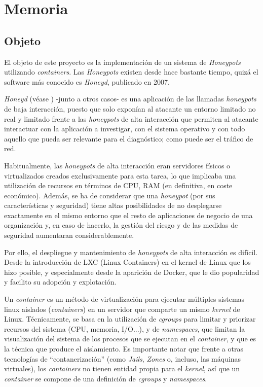 \chapter{Memoria}
\minitoc{}
\section{Objeto}
El objeto de este proyecto es la implementación de un sistema de \emph{Honeypots} utilizando \emph{containers}. 
Las \emph{Honeypots} existen desde hace bastante tiempo, quizá el software más conocido es \emph{Honeyd}, publicado en 2007.

\emph{Honeyd} (véase \cite{honeynet-lowinteraction}) -junto a otros casos- es  una aplicación de las llamadas \emph{honeypots} de baja interacción, puesto que solo exponían al atacante un entorno limitado
no real y limitado frente a las \emph{honeypots} de alta interacción que permiten al atacante interactuar con la aplicación a investigar, con el sistema operativo
y con todo aquello que pueda ser relevante para el diagnóstico; como puede ser el tráfico de red.

Habitualmente, las \emph{honeypots} de alta interacción eran servidores físicos o virtualizados creados exclusivamente para esta tarea, lo que implicaba
una utilización de recursos en términos de CPU, RAM (en definitiva, en coste económico). Además, se ha de considerar que una \emph{honeypot} (por sus características
y seguridad) tiene altas posibilidades de no desplegarse exactamente en el mismo entorno que el resto de aplicaciones de negocio de una organización y, en caso de hacerlo,
la gestión del riesgo y de las medidas de seguridad aumentaran considerablemente.

Por ello, el despliegue y mantenimiento de \emph{honeypots}  de alta interacción es difícil. Desde la introducción de LXC (Linux Containers) en el kernel de Linux que los hizo posible, y
especialmente desde la aparición de Docker, que le dio popularidad y facilito su adopción y explotación.

Un \emph{container} es un método de virtualización para ejecutar múltiples sistemas linux aislados (\emph{containers}) en un servidor que comparte un mismo \emph{kernel} de Linux. Técnicamente, se basa en la utilización
de \emph{cgroups} para limitar y priorizar recursos del sistema (CPU, memoria, I/O...), y de \emph{namespaces}, que limitan la visualización del sistema de los procesos que se ejecutan en el \emph{container}, y que es la técnica que produce el aislamiento. Es importante notar que
frente a otras tecnologías de ``contanerización'' (como \emph{Jails}, \emph{Zones} o, incluso, las máquinas virtuales), los \emph{containers} no tienen entidad propia para el \emph{kernel}, así que un \emph{container} se compone
de una definición de \emph{cgroups} y \emph{namespaces}. 

